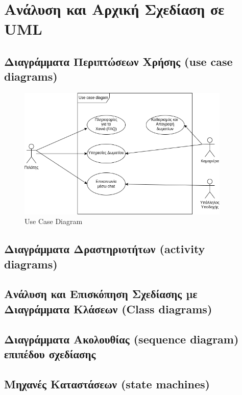 \chapter{Ανάλυση και Αρχική Σχεδίαση σε UML}
	
\section{Διαγράμματα Περιπτώσεων Χρήσης (use case diagrams)}
\begin{figure}[H]
	\centering
	\includegraphics[width=0.9\textwidth]{Images/use_case_diagram_2.5}
	\caption{Use Case Diagram}
	\label{use_case_diag}
\end{figure}
\section{Διαγράμματα Δραστηριοτήτων (activity diagrams)}
\section{Ανάλυση και Επισκόπηση Σχεδίασης µε Διαγράμματα Κλάσεων (Class diagrams)}
\section{Διαγράμματα Ακολουθίας (sequence diagram) επιπέδου σχεδίασης}
\section{Μηχανές Καταστάσεων (state machines)}

